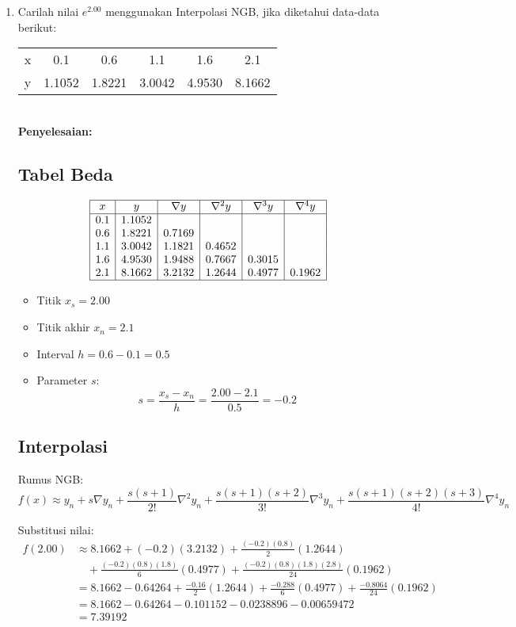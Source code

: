 \documentclass{article}
\newcommand{\penyelesaian}{\textbf{Penyelesaian: }}
\begin{document}
\begin{enumerate}
    \item Carilah nilai $e^{\num{2,00}}$ menggunakan Interpolasi NGB, jika diketahui data-data berikut: \\
    \begin{tabular}{ c c c c c c }
        x & \num{0,1} & \num{0,6} & \num{1,1} & \num{1,6} & \num{2,1} \\
        y & \num{1,1052} & \num{1,8221} & \num{3,0042} & \num{4,9530} & \num{8,1662} \\
    \end{tabular} \\
    \penyelesaian \\
    \subsection*{Tabel Beda}
    \[
    \begin{array}{|c|c|c|c|c|c|}
    \hline
    x & y & \nabla y & \nabla^2 y & \nabla^3 y & \nabla^4 y \\
    \hline
    0.1 & 1.1052 & & & & \\
    0.6 & 1.8221 & 0.7169 & & & \\
    1.1 & 3.0042 & 1.1821 & 0.4652 & & \\
    1.6 & 4.9530 & 1.9488 & 0.7667 & 0.3015 & \\
    2.1 & 8.1662 & 3.2132 & 1.2644 & 0.4977 & 0.1962 \\
    \hline
    \end{array}
    \]

    \begin{itemize}
    \item Titik \( x_s = 2.00 \)
    \item Titik akhir \( x_n = 2.1 \)
    \item Interval  \(h = 0.6 - 0.1 = 0.5 \)
    \item Parameter \( s \):
    \[
    s = \frac{x_s - x_n}{h} = \frac{2.00 - 2.1}{0.5} = -0.2
    \]
    \end{itemize}

    \subsection*{Interpolasi}
    Rumus NGB:
    \[
    f(x) \approx y_n + s \nabla y_n + \frac{s(s+1)}{2!} \nabla^2 y_n + \frac{s(s+1)(s+2)}{3!} \nabla^3 y_n + \frac{s(s+1)(s+2)(s+3)}{4!} \nabla^4 y_n
    \]

    Substitusi nilai:
    \[
    \begin{aligned}
    f(2.00) &\approx 8.1662 + (-0.2)(3.2132) + \frac{(-0.2)(0.8)}{2}(1.2644) \\
    &\quad + \frac{(-0.2)(0.8)(1.8)}{6}(0.4977) + \frac{(-0.2)(0.8)(1.8)(2.8)}{24}(0.1962) \\
    &= 8.1662 - 0.64264 + \frac{-0.16}{2}(1.2644) + \frac{-0.288}{6}(0.4977) + \frac{-0.8064}{24}(0.1962) \\
    &= 8.1662 - 0.64264 - 0.101152 - 0.0238896 - 0.00659472 \\
    &= 7.39192
    \end{aligned}
    \]


\end{enumerate}
\end{document}
